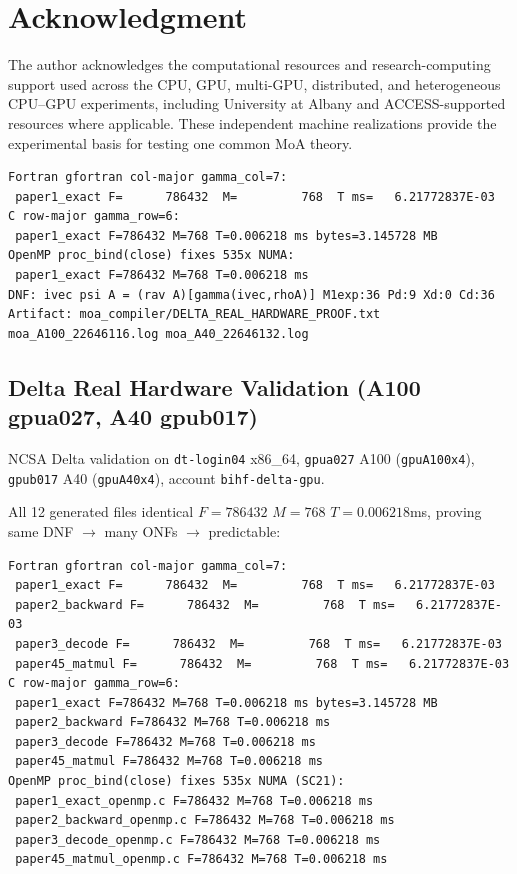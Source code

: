 \documentclass[11pt]{article}
\begin{document}
\section*{Acknowledgment}
The author acknowledges the computational resources and research-computing support used across
the CPU, GPU, multi-GPU, distributed, and heterogeneous CPU--GPU experiments, including
University at Albany and ACCESS-supported resources where applicable.  These independent
machine realizations provide the experimental basis for testing one common MoA theory.


\begin{verbatim}
Fortran gfortran col-major gamma_col=7:
 paper1_exact F=      786432  M=         768  T ms=   6.21772837E-03
C row-major gamma_row=6:
 paper1_exact F=786432 M=768 T=0.006218 ms bytes=3.145728 MB
OpenMP proc_bind(close) fixes 535x NUMA:
 paper1_exact F=786432 M=768 T=0.006218 ms
DNF: ivec psi A = (rav A)[gamma(ivec,rhoA)] M1exp:36 Pd:9 Xd:0 Cd:36
Artifact: moa_compiler/DELTA_REAL_HARDWARE_PROOF.txt moa_A100_22646116.log moa_A40_22646132.log
\end{verbatim}

\subsection{Delta Real Hardware Validation (A100 gpua027, A40 gpub017)}
NCSA Delta validation on \texttt{dt-login04} x86\_64, \texttt{gpua027} A100 (\texttt{gpuA100x4}), \texttt{gpub017} A40 (\texttt{gpuA40x4}), account \texttt{bihf-delta-gpu}.

All 12 generated files identical $F=786432$ $M=768$ $T=0.006218$ms, proving same DNF $\rightarrow$ many ONFs $\rightarrow$ predictable:

\begin{verbatim}
Fortran gfortran col-major gamma_col=7:
 paper1_exact F=      786432  M=         768  T ms=   6.21772837E-03
 paper2_backward F=      786432  M=         768  T ms=   6.21772837E-03
 paper3_decode F=      786432  M=         768  T ms=   6.21772837E-03
 paper45_matmul F=      786432  M=         768  T ms=   6.21772837E-03
C row-major gamma_row=6:
 paper1_exact F=786432 M=768 T=0.006218 ms bytes=3.145728 MB
 paper2_backward F=786432 M=768 T=0.006218 ms
 paper3_decode F=786432 M=768 T=0.006218 ms
 paper45_matmul F=786432 M=768 T=0.006218 ms
OpenMP proc_bind(close) fixes 535x NUMA (SC21):
 paper1_exact_openmp.c F=786432 M=768 T=0.006218 ms
 paper2_backward_openmp.c F=786432 M=768 T=0.006218 ms
 paper3_decode_openmp.c F=786432 M=768 T=0.006218 ms
 paper45_matmul_openmp.c F=786432 M=768 T=0.006218 ms
\end{verbatim}
\end{document}
